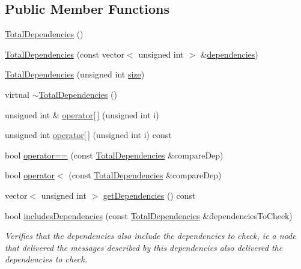 \subsection*{Public Member Functions}
\begin{DoxyCompactItemize}
\item 
\hyperlink{class_total_dependencies_ae066781ee6df2248ee0091a094c1fc1b}{Total\+Dependencies} ()
\item 
\hyperlink{class_total_dependencies_a8bed75c4fa1477c1a5ca07df4c5191cd}{Total\+Dependencies} (const vector$<$ unsigned int $>$ \&\hyperlink{class_total_dependencies_a94825b4f782c30dfebf69dd2eba0bb1f}{dependencies})
\item 
\hyperlink{class_total_dependencies_a8623366d95adc8d1b4da4dee028acbd4}{Total\+Dependencies} (unsigned int \hyperlink{class_total_dependencies_a00ea27540cc51d5770d6013a21a41de2}{size})
\item 
virtual \hyperlink{class_total_dependencies_a960e7c1a6ca7a552cc36fb0bd1244d23}{$\sim$\+Total\+Dependencies} ()
\item 
unsigned int \& \hyperlink{class_total_dependencies_a3ec4e57f16606c11d6bd9de29a93c045}{operator\mbox{[}$\,$\mbox{]}} (unsigned int i)
\item 
unsigned int \hyperlink{class_total_dependencies_ad684b13fac0f7474fa68880ef9f5a30a}{operator\mbox{[}$\,$\mbox{]}} (unsigned int i) const
\item 
bool \hyperlink{class_total_dependencies_a8e3f326e355d9bb0364f160dcf0a4126}{operator==} (const \hyperlink{class_total_dependencies}{Total\+Dependencies} \&compare\+Dep)
\item 
bool \hyperlink{class_total_dependencies_ae5899d93bd269484c5ed6b5809d8d500}{operator$<$} (const \hyperlink{class_total_dependencies}{Total\+Dependencies} \&compare\+Dep)
\item 
vector$<$ unsigned int $>$ \hyperlink{class_total_dependencies_a43a89fb00be27b354a4df86f6c3c8b6e}{get\+Dependencies} () const
\item 
bool \hyperlink{class_total_dependencies_a66aebb100cbce0faf5551fd74b0de0d8}{includes\+Dependencies} (const \hyperlink{class_total_dependencies}{Total\+Dependencies} \&dependencies\+To\+Check)
\begin{DoxyCompactList}\small\item\em Verifies that the dependencies also include the dependencies to check, ie a node that delivered the messages described by this dependencies also delivered the dependencies to check. \end{DoxyCompactList}\item 

\end{DoxyCompactItemize}
